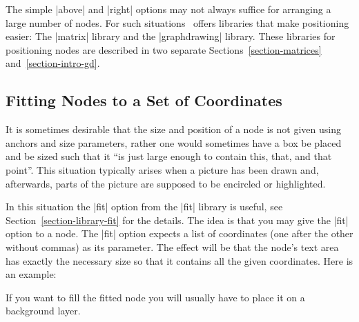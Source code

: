 The simple |above| and |right| options may not always suffice for arranging a
large number of nodes. For such situations \tikzname\ offers libraries that
make positioning easier: The |matrix| library and the |graphdrawing| library.
These libraries for positioning nodes are described in two separate
Sections~\ref{section-matrices} and~\ref{section-intro-gd}.


\subsection{Fitting Nodes to a Set of Coordinates}
\label{section-nodes-fitting}

It is sometimes desirable that the size and position of a node is not given
using anchors and size parameters, rather one would sometimes have a box be
placed and be sized such that it ``is just large enough to contain this, that,
and that point''. This situation typically arises when a picture has been drawn
and, afterwards, parts of the picture are supposed to be encircled or
highlighted.

In this situation the |fit| option from the |fit| library is useful, see
Section~\ref{section-library-fit} for the details. The idea is that you may
give the |fit| option to a node. The |fit| option expects a list of coordinates
(one after the other without commas) as its parameter. The effect will be that
the node's text area has exactly the necessary size so that it contains all the
given coordinates. Here is an example:
%
\begin{codeexample}[preamble={\usetikzlibrary{fit,shapes.geometric}}]
\end{codeexample}

If you want to fill the fitted node you will usually have to place it on a
background layer.
%
\begin{codeexample}[preamble={\usetikzlibrary{backgrounds,fit,shapes.geometric}}]
\end{codeexample}


